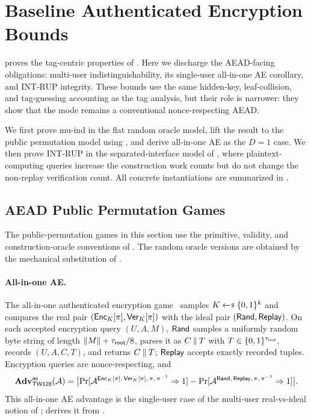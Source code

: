 \section{Baseline Authenticated Encryption Bounds}
\label{sec:aead-security}

 proves the tag-centric properties of \TW{}.
Here we discharge the AEAD-facing obligations: multi-user indistinguishability,
its single-user all-in-one AE corollary, and \textsf{INT-RUP} integrity. These
bounds use the same hidden-key, leaf-collision, and tag-guessing accounting as
the tag analysis, but their role is narrower: they show that the mode remains a
conventional nonce-respecting AEAD.

We first prove mu-ind in the flat random oracle model, lift the result to the
public permutation model using , and derive
all-in-one AE as the $D = 1$ case. We then prove \textsf{INT-RUP} in the
separated-interface model of \cite{ABLMMY14}, where plaintext-computing queries
increase the construction work counts but do not change the non-replay
verification count. All concrete instantiations are summarized in
.

\subsection{AEAD Public Permutation Games}
\label{sec:aead-games}

The public-permutation games in this section use the primitive, validity, and
construction-oracle conventions of . The random oracle
versions are obtained by the mechanical substitution of .

\paragraph{All-in-one AE.}
The all-in-one authenticated encryption game~\cite{RS06,BT16} samples
$K \sample \bits^k$ and compares the real pair
$(\mathsf{Enc}_K[\pi], \mathsf{Ver}_K[\pi])$ with the ideal pair $(\mathsf{Rand}, \mathsf{Replay})$.
On each accepted encryption query $(U, A, M)$, $\mathsf{Rand}$ samples a uniformly
random byte string of length $\|M\| + \tau_{\mathsf{root}}/8$, parses it as
$C \mathbin{\|} T$ with $T \in \{0,1\}^{\tau_{\mathsf{root}}}$, records $(U, A, C, T)$, and
returns $C \mathbin{\|} T$; $\mathsf{Replay}$ accepts exactly recorded tuples. Encryption
queries are nonce-respecting, and
\[
  \mathbf{Adv}^{\mathsf{ae}}_{\textsf{TW128}}(\mathcal{A}) =
  \bigl|
    \Pr[\mathcal{A}^{\mathsf{Enc}_K[\pi],\, \mathsf{Ver}_K[\pi],\, \pi,\, \pi^{-1}} \Rightarrow 1]
    - \Pr[\mathcal{A}^{\mathsf{Rand},\, \mathsf{Replay},\, \pi,\, \pi^{-1}} \Rightarrow 1]
  \bigr|.
\]
This all-in-one AE advantage is the single-user case of the multi-user
real-vs-ideal notion of ;  derives it from
.


